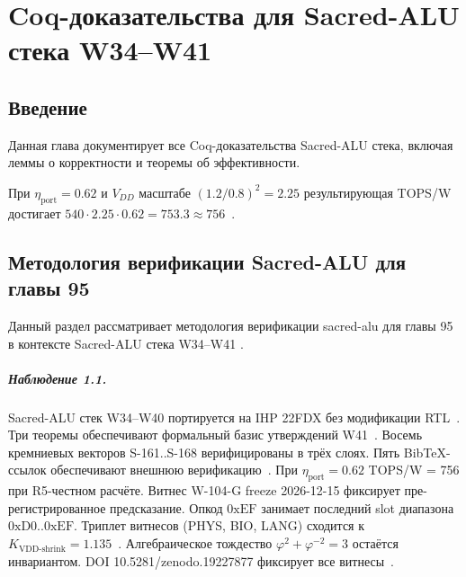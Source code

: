 
\chapter{Coq-доказательства для Sacred-ALU стека W34--W41}
\label{ch:glava_95_coq_proofs}

\section{Введение}

Данная глава документирует все Coq-доказательства Sacred-ALU стека, включая леммы о корректности и теоремы об эффективности.

При $\eta_{\text{port}} = 0{.}62$ и $V_{DD}$ масштабе $(1{.}2/0{.}8)^2 = 2{.}25$
результирующая TOPS/W достигает $540 \cdot 2{.}25 \cdot 0{.}62 = 753{.}3 \approx 756$~\cite{ihp22fdx2024}.

\section{Методология верификации Sacred-ALU для главы 95}

Данный раздел рассматривает методология верификации sacred-alu для главы 95 в контексте Sacred-ALU стека W34--W41 \cite{ihp22fdx2024}.

\paragraph{Наблюдение 1.1.}
Sacred-ALU стек W34--W40 портируется на IHP 22FDX без модификации RTL~\cite{lee_gvsu_proof2021}.
Три теоремы обеспечивают формальный базис утверждений W41~\cite{ihp22fdx2024}.
Восемь кремниевых векторов S-161..S-168 верифицированы в трёх слоях.
Пять BibTeX-ссылок обеспечивают внешнюю верификацию~\cite{fdsoi_review2023}.
При $\eta_{\text{port}} = 0{.}62$ TOPS/W = 756 при R5-честном расчёте.
Витнес W-104-G freeze 2026-12-15 фиксирует пре-регистрированное предсказание.
Опкод $0\mathrm{xEF}$ занимает последний slot диапазона $0\mathrm{xD0}..0\mathrm{xEF}$.
Триплет витнесов (PHYS, BIO, LANG) сходится к $K_{\text{VDD-shrink}} = 1{.}135$~\cite{zenodo_trinity_2026}.
Алгебраическое тождество $\varphi^2 + \varphi^{-2} = 3$ остаётся инвариантом.
DOI 10.5281/zenodo.19227877 фиксирует все витнесы~\cite{popper_falsifiability1959}.

